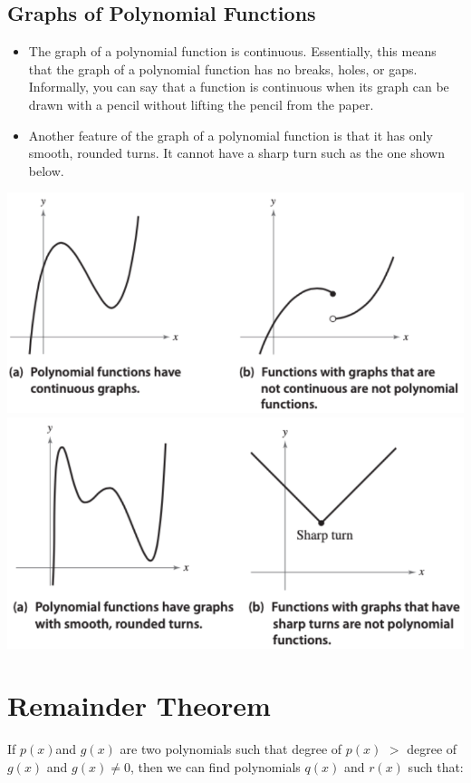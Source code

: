 \documentclass{book}
\begin{document}
		\subsection{Graphs of Polynomial Functions}
		\begin{itemize}
			\item The graph of a polynomial function is continuous. Essentially, this means that the graph of a polynomial function has no breaks, holes, or gaps. Informally, you can say that a function is continuous when its graph can be drawn with a pencil without lifting the pencil from the paper.
			\item Another feature of the graph of a polynomial function is that it has only smooth, rounded turns. It cannot have a sharp turn such as the one shown below.
		\end{itemize}
	
		\includegraphics[scale=0.5]{polygraph1} \\
		\includegraphics[scale=0.5]{polygraph2} \\
		
		
	\section{Remainder Theorem}
	If $p(x) $and $g(x)$ are two polynomials such that degree of $p(x)$ $>$ degree of $g(x)$ and $g(x) \neq 0$, then we can find polynomials $q(x)$ and $r(x)$ such that:
	
\end{document}
